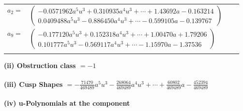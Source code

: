 \documentclass[1p]{elsarticle_modified}
\theoremstyle{definition}
\begin{document}
\begin{tabular}{m{7pt} m{180pt} m{7pt} m{180pt} }
\flushright $a_{2}=$&$\begin{pmatrix}-0.0571962 a^{5} u^{3}+0.310935 a^{4} u^{3}+\cdots+1.43692 a-0.163214\\0.0409488 a^{5} u^{3}-0.886450 a^{4} u^{3}+\cdots-0.599105 a-0.139767\end{pmatrix}$ \\
\flushright $a_{9}=$&$\begin{pmatrix}-0.177120 a^{5} u^{3}+0.152318 a^{4} u^{3}+\cdots+1.00470 a+1.79206\\0.101777 a^{5} u^{3}-0.569117 a^{4} u^{3}+\cdots-1.15970 a-1.37536\end{pmatrix}$\\&\end{tabular}
\flushleft \textbf{(ii) Obstruction class $= -1$}\\~\\
\flushleft \textbf{(iii) Cusp Shapes $= -\frac{71470}{469489} a^5 u^3-\frac{268064}{469489} a^4 u^3+\cdots+\frac{60802}{469489} a-\frac{452394}{469489}$}\\~\\
\newpage\renewcommand{\arraystretch}{1}
\flushleft \textbf{(iv) u-Polynomials at the component}\newline \\
\end{document}
